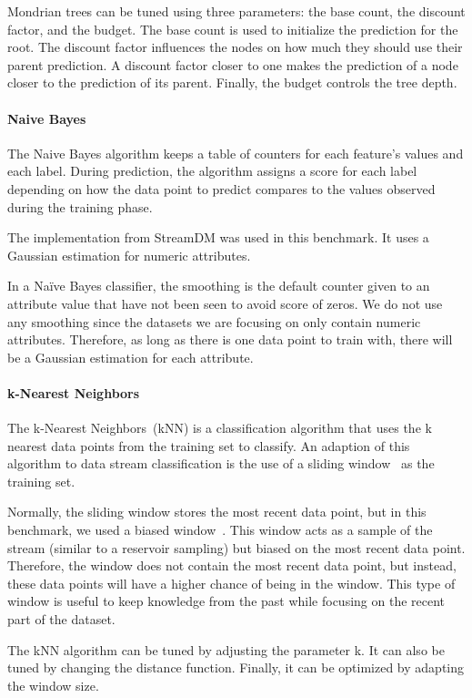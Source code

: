 Mondrian trees can be tuned using three
parameters: the base count, the discount factor,
and the budget. The base count is used to
initialize the prediction for the root. The
discount factor influences the nodes on how much
they should use their parent prediction. A
discount factor closer to one makes the prediction
of a node closer to the prediction of its parent.
Finally, the budget controls the tree depth.

\paragraph{Naive Bayes~\cite{naive_bayes}}
The Naive Bayes algorithm keeps a table of
counters for each feature's values and each label.
During prediction, the algorithm assigns a
score for each label depending on how the data
point to predict compares to the values observed
during the training phase.

The implementation from StreamDM was used in this
benchmark. It uses a Gaussian
estimation for numeric attributes.

In a Naïve Bayes classifier, the smoothing is the
default counter given to an attribute value that
have not been seen to avoid score of zeros.
We do not use any smoothing since the datasets
we are focusing on only contain numeric
attributes. Therefore, as long as there is one data
point to train with, there will be a Gaussian
estimation for each attribute.

\paragraph{k-Nearest Neighbors}
The k-Nearest Neighbors~(kNN) is a classification
algorithm that uses the k nearest data points from
the training set to classify.  An adaption of this
algorithm to data stream classification is the use
of a sliding window~\cite{Mining_Massive_Datasets}
as the training set.

Normally, the sliding window stores the most
recent data point, but in this benchmark, we used
a biased window~\cite{biased_reservoir_sampling}.
This window acts as a sample of
the stream (similar to a reservoir sampling) but
biased on the most recent data point.  Therefore,
the window does not contain the most recent data
point, but instead, these data points will have a
higher chance of being in the window.  This type
of window is useful to keep knowledge from the
past while focusing on the recent part of the
dataset.

The kNN algorithm can be tuned by adjusting the
parameter k. It can also be tuned by changing the
distance function. Finally, it can be optimized by
adapting the window size.

